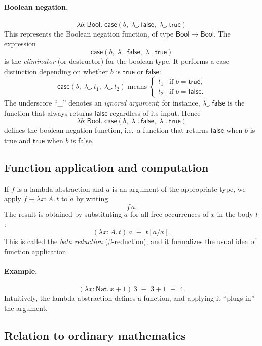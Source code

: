 \documentclass{article}
\newcommand{\caseof}{\mathsf{case}}
\newcommand{\Nat}{\mathsf{Nat}}
\newcommand{\Bool}{\mathsf{Bool}}
\newcommand{\jdeq}{\equiv}                 %
\begin{document}
\paragraph{Boolean negation.}
\[
\lambda b\!:\!\Bool.\;
\caseof(b,\;
  \lambda\_.\,\mathsf{false},\;
  \lambda\_.\,\mathsf{true})
\]
This represents the Boolean negation function, of type \(\Bool \to \Bool\). The expression
\[
\caseof(b,\;
  \lambda\_.\,\mathsf{false},\;
  \lambda\_.\,\mathsf{true})
\]
is the \emph{eliminator} (or destructor) for the boolean type.
It performs a case distinction depending on whether \(b\) is
\(\mathsf{true}\) or \(\mathsf{false}\):
\[
\caseof(b,\;
  \lambda\_.\,t_1,\;
  \lambda\_.\,t_2)
\;\text{means}\;
\begin{cases}
t_1 & \text{if } b = \mathsf{true},\\
t_2 & \text{if } b = \mathsf{false}.
\end{cases}
\]
The underscore ``\_'' denotes an \emph{ignored argument};
for instance, \(\lambda\_.\,\mathsf{false}\) is the function that always returns
\(\mathsf{false}\) regardless of its input.
Hence
\[
\lambda b\!:\!\Bool.\;
\caseof(b,\;
  \lambda\_.\,\mathsf{false},\;
  \lambda\_.\,\mathsf{true})
\]
defines the boolean negation function, i.e.\ a function that returns
\(\mathsf{false}\) when \(b\) is true and \(\mathsf{true}\) when \(b\) is false.

\subsection*{Function application and computation}

If \(f\) is a lambda abstraction and \(a\) is an argument of the appropriate type,  
we apply \(f \jdeq \lambda x\!:\!A.\,t \) to \(a\) by writing
\[
f\,a.
\]
The result is obtained by substituting \(a\) for all free occurrences of \(x\) in the body \(t\):
\[
(\lambda x\!:\!A.\,t)\,a \;\jdeq\; t[a/x].
\]
This is called the \emph{beta reduction} (\(\beta\)-reduction), and it formalizes the usual idea of function application.

\paragraph{Example.}
\[
(\lambda x\!:\!\Nat.\,x + 1)\,3 \;\jdeq\; 3 + 1 \;\jdeq\; 4.
\]
Intuitively, the lambda abstraction defines a function, and applying it ``plugs in'' the argument.

\subsection*{Relation to ordinary mathematics}
\end{document}
